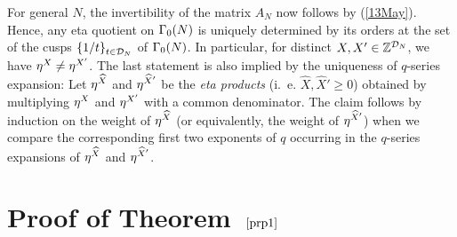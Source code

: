 \documentclass[a4paper,11pt]{amsart}
\begin{document}
For general $N$, the invertibility of the matrix $A_N$ now %
follows by (\ref{13May}).
Hence, any eta quotient on $\Gamma_0(N)$ is uniquely determined by its orders at the set of the cusps
$\{1/t\}_{\substack{\ \\ t\in\mathcal{D}_N}}$ of $\Gamma_0(N)$. In particular, for distinct $X,X'\in\mathbb{Z}^{\mathcal{D}_N}$, we have $\eta^X\neq\eta^{X'}$. 
The last statement %
is also implied by the uniqueness of $q$-series expansion:
Let $\eta^{\widehat{X}}$ and $\eta^{\widehat{X}'}$
be the \emph{eta products} (i.~e.  $\widehat{X}, \widehat{X}'\geq0$)
obtained by multiplying $\eta^X$ and $\eta^{X'}$ with a common denominator. The claim follows by induction on the weight of $\eta^{\widehat{X}}$
(or equivalently, the weight of $\eta^{\widehat{X}'}$)
when we compare
the corresponding 
first two exponents of $q$
occurring in the $q$-series expansions of %
$\eta^{\widehat{X}}$ and $\eta^{\widehat{X}'}$.

\section{%
Proof of Theorem~$\ref{prp1}$}
\label{17.6Sept}
\end{document}

